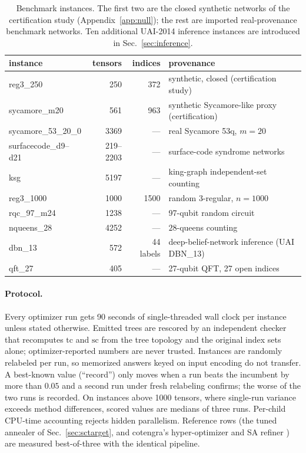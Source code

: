 \documentclass{SciPost}
\newcommand{\tc}{\ensuremath{\mathrm{tc}}}
\newcommand{\sct}{\ensuremath{\mathrm{sc}}}
\begin{document}
\begin{table}[t]
\centering
\small
\begin{tabular}{lrrl}
\toprule
instance & tensors & indices & provenance \\
\midrule
reg3\_250 & 250 & 372 & synthetic, closed (certification study) \\
sycamore\_m20 & 561 & 963 & synthetic Sycamore-like proxy (certification) \\
sycamore\_53\_20\_0 & 3369 & --- & real Sycamore 53q, $m{=}20$ \cite{gray_2020_hyper} \\
surfacecode\_d9--d21 & 219--2203 & --- & surface-code syndrome networks \\
ksg & 5197 & --- & king-graph independent-set counting \\
reg3\_1000 & 1000 & 1500 & random 3-regular, $n{=}1000$ \\
rqc\_97\_m24 & 1238 & --- & 97-qubit random circuit \\
nqueens\_28 & 4252 & --- & $28$-queens counting \\
dbn\_13 & 572 & 44 labels & deep-belief-network inference (UAI DBN\_13) \\
qft\_27 & 405 & --- & 27-qubit QFT, 27 open indices \\
\bottomrule
\end{tabular}
\caption{Benchmark instances. The first two are the closed synthetic
networks of the certification study
(Appendix~\ref{app:null}); the rest are imported real-provenance benchmark
networks. Ten additional UAI-2014 inference instances are introduced in
Sec.~\ref{sec:inference}.}
\label{tab:instances}
\end{table}

\paragraph{Protocol.}
Every optimizer run gets 90 seconds of single-threaded wall clock per
instance unless stated otherwise. Emitted trees are rescored by an
independent checker that recomputes $\tc$ and $\sct$ from the tree
topology and the original index sets alone; optimizer-reported numbers
are never trusted. Instances are randomly relabeled per run, so memorized
answers keyed on input encoding do not transfer. A best-known value
(``record'') only moves when a run beats the incumbent by more than
$0.05$ and a second run under fresh relabeling confirms; the worse of the
two runs is recorded. On instances above 1000 tensors, where single-run
variance exceeds method differences, scored values are medians of three
runs. Per-child CPU-time accounting rejects hidden parallelism. Reference
rows (the tuned annealer of Sec.~\ref{sec:sctarget}, and cotengra's
hyper-optimizer and SA refiner \cite{gray_2020_hyper}) are measured
best-of-three with the identical pipeline.
\end{document}
